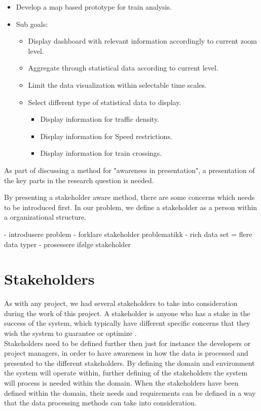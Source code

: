 \begin{itemize}
	\item Develop a map based prototype for train analysis.
	\item Sub goals:
	\begin{itemize}
		\item Display dashboard with relevant information accordingly to 
		current zoom level.
		\item Aggregate through statistical data according to current level.
		\item Limit the data visualization within selectable time scales.
		\item Select different type of statistical data to display.
		\begin{itemize}
			\item Display information for traffic density.
			\item Display information for Speed restrictions.
			\item Display information for train crossings.
		\end{itemize}
	\end{itemize}
\end{itemize}

As part of discussing a method for "awareness in presentation", a presentation
of the key parts in the research question is needed. 

By presenting a stakeholder aware method, there are some concerns which needs
to be introduced first. In our problem, we define a stakeholder as a person
within a organizational structure. 

- introdusere problem
- forklare stakeholder problematikk
- rich data set = flere data typer
- prosessere ifølge stakeholder


\section{Stakeholders} %
\label{sec:intro_stakeholders}  
As with any project, we had several stakeholders to take into consideration
during the work of this project. A stakeholder is anyone who has a stake in 
the success of the system, which typically have different specific concerns 
that they wish the system to guarantee or optimize 
\cite{Bass:2012:SAP:2392670}.\\

Stakeholders need to be defined further then just for instance the developers
or project managers, in order to have awareness in how the data is processed 
and presented to the different stakeholders. 
By defining the domain and environment the system will
operate within, further defining of the stakeholders the system will process 
is needed within the domain. When the stakeholders have been defined within 
the domain, their needs and requirements can be defined in a way that the data 
processing methods can take into consideration. \\

